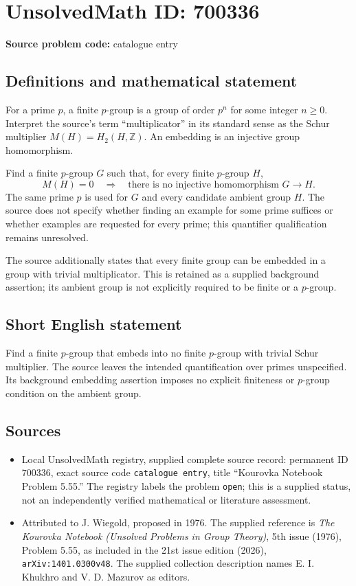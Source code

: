 \documentclass[11pt]{article}
\newcommand{\Z}{\mathbb{Z}}
\begin{document}
\section*{UnsolvedMath ID: 700336}
\textbf{Source problem code:} catalogue entry
\subsection{Definitions and mathematical statement}
For a prime \(p\), a finite \(p\)-group is a group of order \(p^n\) for some integer \(n\geq 0\). Interpret the source's term ``multiplicator'' in its standard sense as the Schur multiplier \(M(H)=H_2(H,\Z)\). An embedding is an injective group homomorphism.

Find a finite \(p\)-group \(G\) such that, for every finite \(p\)-group \(H\),
\[
M(H)=0\quad\Longrightarrow\quad
\text{there is no injective homomorphism }G\longrightarrow H.
\]
The same prime \(p\) is used for \(G\) and every candidate ambient group \(H\). The source does not specify whether finding an example for some prime suffices or whether examples are requested for every prime; this quantifier qualification remains unresolved.

The source additionally states that every finite group can be embedded in a group with trivial multiplicator. This is retained as a supplied background assertion; its ambient group is not explicitly required to be finite or a \(p\)-group.
\subsection{Short English statement}
Find a finite \(p\)-group that embeds into no finite \(p\)-group with trivial Schur multiplier. The source leaves the intended quantification over primes unspecified. Its background embedding assertion imposes no explicit finiteness or \(p\)-group condition on the ambient group.
\subsection{Sources}
\begin{itemize}
\item Local UnsolvedMath registry, supplied complete source record: permanent ID \(700336\), exact source code \texttt{catalogue entry}, title ``Kourovka Notebook Problem 5.55.'' The registry labels the problem \texttt{open}; this is a supplied status, not an independently verified mathematical or literature assessment.
\item Attributed to J. Wiegold, proposed in 1976. The supplied reference is \emph{The Kourovka Notebook (Unsolved Problems in Group Theory)}, 5th issue (1976), Problem 5.55, as included in the 21st issue edition (2026), \texttt{arXiv:1401.0300v48}. The supplied collection description names E. I. Khukhro and V. D. Mazurov as editors.
\end{itemize}
\end{document}
